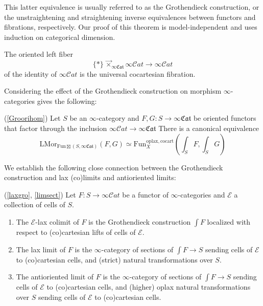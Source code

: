 \documentclass[10pt,oneside]{article}
\numberwithin{equation}{section} %
\numberwithin{figure}{section} %
\theoremstyle{plain}
\theoremstyle{definition}
\newcommand{\mE}{{\mathcal E}}
\renewcommand{\L}{{\mathrm L}}
\newcommand{\Fun}{\mathrm{Fun}}
\newcommand{\cocart}{{\mathrm{cocart}}}
\newcommand{\oplax}{{\mathrm{oplax}}}
\newcommand{\Mor}{{\mathrm{Mor}}}
\newcommand{\scat}{\mathcal{C}\mathit{at}}
\newcommand{\fcat}{\mathfrak{Cat}}
\begin{document}
This latter equivalence is usually referred to as the Grothendieck construction, or the unstraightening and straightening inverse equivalences between functors and fibrations, respectively.
Our proof of this theorem is model-independent and uses induction on categorical dimension.

\begin{corollary}
The oriented left fiber $$ \{ *\} \,{\vec{\times}}_{\infty\fcat} \infty\scat \to \infty\scat $$ of the identity of $\infty\scat$ is the universal cocartesian fibration.
\end{corollary}

Considering the effect of the Grothendieck construction on morphism $\infty$-categories gives the following:

\begin{corollary}(\cref{Groorihom})
Let $S$ be an $\infty$-category and $F,G: S \to \infty\fcat$ be oriented functors that factor through the inclusion $\infty\scat\to\infty\fcat$
There is a canonical equivalence
$$ \L\Mor_{{\Fun\boxtimes}(S,\infty\mathfrak{Cat})}(F,G) \simeq \Fun^{\oplax, \cocart}_X(\int_S F, \int_S G)$$
    
\end{corollary}



We establish the following close connection between the Grothendieck construction and lax (co)limits and antioriented limits: 

\begin{theorem}\label{THH4}(\cref{laxgro}, \cref{limsect})
Let $F: S \to \infty\scat$ be a functor of $\infty$-categories and $\mE$ a collection of cells of $S$.
\begin{enumerate}[\normalfont(1)]\setlength{\itemsep}{-2pt}
\item The $\mE$-lax colimit of $F$ is the Grothendieck construction $\int F$ localized with respect to (co)cartesian lifts of cells of $\mE.$

\item The lax limit of $F$ is the $\infty$-category of sections of $\int F \to S $ sending cells of $\mE$ to (co)cartesian cells, 
and (strict) natural transformations over $S$.

\item The antioriented limit of $F$ is the $\infty$-category of sections 
of $\int F \to S $ sending cells of $\mE$ to (co)cartesian cells, 
and (higher) oplax natural transformations over $S$ sending cells of $\mE$ to (co)cartesian cells.

\end{enumerate}

\end{theorem}
\end{document}
